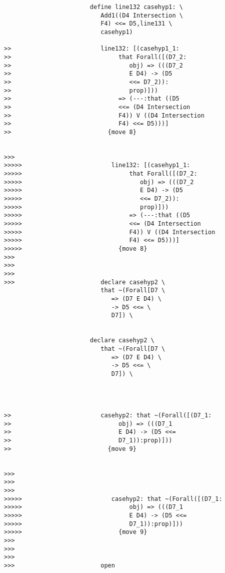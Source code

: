 \documentclass[12pt]{article}
\begin{document}
\begin{verbatim}
                        define line132 casehyp1: \
                           Add1((D4 Intersection \
                           F4) <<= D5,line131 \
                           casehyp1)

>>                         line132: [(casehyp1_1:
>>                              that Forall([(D7_2:
>>                                 obj) => (((D7_2
>>                                 E D4) -> (D5
>>                                 <<= D7_2)):
>>                                 prop)]))
>>                              => (---:that ((D5
>>                              <<= (D4 Intersection
>>                              F4)) V ((D4 Intersection
>>                              F4) <<= D5)))]
>>                           {move 8}


>>>
>>>>>                         line132: [(casehyp1_1:
>>>>>                              that Forall([(D7_2:
>>>>>                                 obj) => (((D7_2
>>>>>                                 E D4) -> (D5
>>>>>                                 <<= D7_2)):
>>>>>                                 prop)]))
>>>>>                              => (---:that ((D5
>>>>>                              <<= (D4 Intersection
>>>>>                              F4)) V ((D4 Intersection
>>>>>                              F4) <<= D5)))]
>>>>>                           {move 8}
>>>
>>>
>>>
>>>                        declare casehyp2 \
                           that ~(Forall[D7 \
                              => (D7 E D4) \
                              -> D5 <<= \
                              D7]) \
                           

                        declare casehyp2 \
                           that ~(Forall[D7 \
                              => (D7 E D4) \
                              -> D5 <<= \
                              D7]) \
                           



>>                         casehyp2: that ~(Forall([(D7_1:
>>                              obj) => (((D7_1
>>                              E D4) -> (D5 <<=
>>                              D7_1)):prop)]))
>>                           {move 9}


>>>
>>>
>>>
>>>>>                         casehyp2: that ~(Forall([(D7_1:
>>>>>                              obj) => (((D7_1
>>>>>                              E D4) -> (D5 <<=
>>>>>                              D7_1)):prop)]))
>>>>>                           {move 9}
>>>
>>>
>>>
>>>                        open


\end{verbatim}
\end{document}
